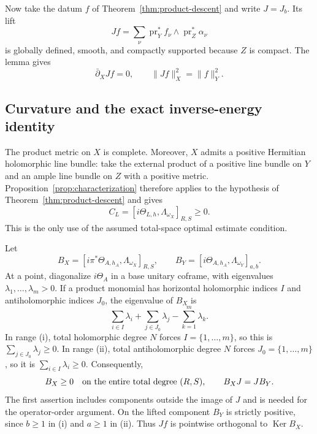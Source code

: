 \documentclass[11pt,reqno]{amsart}
\numberwithin{equation}{section}
\theoremstyle{definition}
\theoremstyle{remark}
\newcommand{\db}{\bar\partial}
\newcommand{\Ker}{\operatorname{Ker}}
\begin{document}
Now take the datum $f$ of Theorem~\ref{thm:product-descent} and write $J=J_b$. Its lift
\begin{equation}\label{eq:harmonic-lift}
 Jf=\sum_\nu\operatorname{pr}_Y^*f_\nu\wedge
                    \operatorname{pr}_Z^*\alpha_\nu
\end{equation}
is globally defined, smooth, and compactly supported because $Z$ is compact. The lemma gives
\begin{equation}\label{eq:lift-properties}
 \db_XJf=0,\qquad \|Jf\|_X^2=\|f\|_Y^2.
\end{equation}

\subsection{Curvature and the exact inverse-energy identity}
The product metric on $X$ is complete. Moreover, $X$ admits a positive Hermitian holomorphic line bundle: take the external product of a positive line bundle on $Y$ and an ample line bundle on $Z$ with a positive metric. Proposition~\ref{prop:characterization} therefore applies to the hypothesis of Theorem~\ref{thm:product-descent} and gives
\begin{equation}\label{eq:total-curvature}
 C_L=[i\Theta_{L,h},\Lambda_{\omega_X}]_{R,S}\geq0.
\end{equation}
This is the only use of the assumed total-space optimal estimate condition.

Let
\[
 B_X=[i\pi^*\Theta_{A,h_A},\Lambda_{\omega_X}]_{R,S},
 \qquad B_Y=[i\Theta_{A,h_A},\Lambda_{\omega_Y}]_{a,b}.
\]
At a point, diagonalize $i\Theta_A$ in a base unitary coframe, with eigenvalues $\lambda_1,\ldots,\lambda_m>0$. If a product monomial has horizontal holomorphic indices $I$ and antiholomorphic indices $J_0$, the eigenvalue of $B_X$ is
\begin{equation}\label{eq:pullback-eigenvalue}
 \sum_{i\in I}\lambda_i+\sum_{j\in J_0}\lambda_j
                      -\sum_{k=1}^m\lambda_k.
\end{equation}
In range (i), total holomorphic degree $N$ forces $I=\{1,\ldots,m\}$, so this is $\sum_{j\in J_0}\lambda_j\geq0$. In range (ii), total antiholomorphic degree $N$ forces $J_0=\{1,\ldots,m\}$, so it is $\sum_{i\in I}\lambda_i\geq0$. Consequently,
\begin{equation}\label{eq:whole-nonnegative}
 B_X\geq0\quad\hbox{on the entire total degree }(R,S),
 \qquad B_XJ=JB_Y.
\end{equation}
The first assertion includes components outside the image of $J$ and is needed for the operator-order argument. On the lifted component $B_Y$ is strictly positive, since $b\geq1$ in (i) and $a\geq1$ in (ii). Thus $Jf$ is pointwise orthogonal to $\Ker B_X$.
\end{document}
